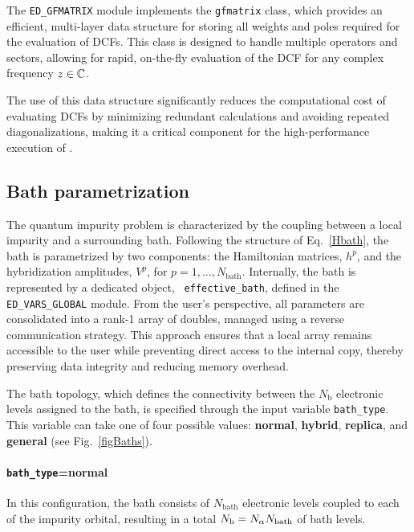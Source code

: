 \documentclass[edipack2.tex]{subfiles}
\begin{document}
The {\tt ED\_GFMATRIX} module implements the {\tt gfmatrix} class, 
which provides an efficient, multi-layer data structure for storing 
all weights and poles required for the evaluation of DCFs. This 
class is designed to handle multiple operators and sectors, allowing 
for rapid, on-the-fly evaluation of the DCF for any complex frequency 
$z\in\mathbb{C}$.

The use of this data structure significantly reduces the computational 
cost of evaluating DCFs by minimizing redundant calculations and 
avoiding repeated diagonalizations, making it a critical component 
for the high-performance execution of \NAME.





















\subsection{Bath parametrization}\label{sSecBath}
The quantum impurity problem is characterized by the coupling between
a local impurity and a surrounding bath. Following the structure of
Eq.~\ref{Hbath}, the bath is parametrized by two components: the
Hamiltonian matrices, $h^p$, and the hybridization amplitudes,
$V^p$, for $p = 1, \dots, N_\mathrm{bath}$.
Internally, the bath is represented by a dedicated object, {\tt
  effective\_bath}, defined in the {\tt ED\_VARS\_GLOBAL} module. From
the user's perspective, all parameters are consolidated into a rank-1
array of doubles, managed using a reverse communication strategy. This
approach ensures that a local array remains accessible to the
user while preventing direct access to the internal copy, thereby
preserving data integrity and reducing memory overhead.


The bath topology, which defines the connectivity between the
$N_\mathrm{b}$ electronic levels assigned to the bath, is specified
through the input variable {\tt bath\_type}. This variable can take
one of four possible values: {\bf normal}, {\bf hybrid}, {\bf
  replica}, and {\bf general} (see Fig.~\ref{figBaths}).



\paragraph{{\tt bath\_type}={\bf normal}} In this configuration, the
bath consists  of $N_\mathrm{bath}$
electronic levels coupled to each of the impurity orbital, resulting
in a total  $N_\mathrm{b} = N_\alpha N_\mathrm{bath}$ of bath levels.
\end{document}
